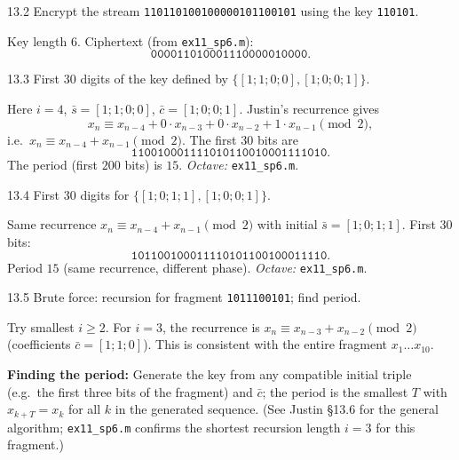 \begin{exercise}{13.2}
Encrypt the stream \texttt{110110100100000101100101} using the key \texttt{110101}.
\end{exercise}
\begin{solution}
Key length $6$. Ciphertext (from \texttt{ex11\_sp6.m}):
\[
\texttt{000011010001110000010000}.
\]
\end{solution}

\begin{exercise}{13.3}
First $30$ digits of the key defined by $\{[1;1;0;0],[1;0;0;1]\}$.
\end{exercise}
\begin{solution}
Here $i=4$, $\bar{s}=[1;1;0;0]$, $\bar{c}=[1;0;0;1]$. Justin's recurrence gives
\[
x_n \equiv x_{n-4} + 0\cdot x_{n-3} + 0\cdot x_{n-2} + 1\cdot x_{n-1} \pmod 2,
\]
i.e.\ $x_n\equiv x_{n-4}+x_{n-1}\pmod 2$. The first $30$ bits are
\[
\texttt{110010001111010110010001111010}.
\]
The period (first $200$ bits) is $15$. \textit{Octave:} \texttt{ex11\_sp6.m}.
\end{solution}

\begin{exercise}{13.4}
First $30$ digits for $\{[1;0;1;1],[1;0;0;1]\}$.
\end{exercise}
\begin{solution}
Same recurrence $x_n\equiv x_{n-4}+x_{n-1}\pmod 2$ with initial $\bar{s}=[1;0;1;1]$. First $30$ bits:
\[
\texttt{101100100011110101100100011110}.
\]
Period $15$ (same recurrence, different phase). \textit{Octave:} \texttt{ex11\_sp6.m}.
\end{solution}

\begin{exercise}{13.5}
Brute force: recursion for fragment \texttt{1011100101}; find period.
\end{exercise}
\begin{solution}
Try smallest $i\ge 2$. For $i=3$, the recurrence is $x_n\equiv x_{n-3}+x_{n-2}\pmod 2$ (coefficients $\bar{c}=[1;1;0]$). This is consistent with the entire fragment $x_1\ldots x_{10}$.

\textbf{Finding the period:} Generate the key from any compatible initial triple (e.g.\ the first three bits of the fragment) and $\bar{c}$; the period is the smallest $T$ with $x_{k+T}=x_k$ for all $k$ in the generated sequence. (See Justin \S13.6 for the general algorithm; \texttt{ex11\_sp6.m} confirms the shortest recursion length $i=3$ for this fragment.)
\end{solution}


